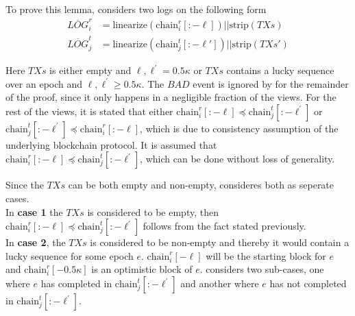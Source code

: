 To prove this lemma, \cite{thunderella} considers two logs on the following form 
\begin{align*}
    \overline{LOG}^r_i &= \text{linearize}(\text{chain}_i^r[:-\ell])||\text{strip}(TXs) \\
    \overline{LOG}^t_j &= \text{linearize}(\text{chain}_j^t[:-\ell'])||\text{strip}(TXs')
\end{align*}

Here $TXs$ is either empty and $\ell,\ell^{'} = 0.5\kappa$ or $TXs$ contains a lucky sequence over an epoch and $\ell,\ell^{'} \geq 0.5\kappa$. The $BAD$ event is ignored by \cite{thunderella} for the remainder of the proof, since it only happens in a negligible fraction of the views. For the rest of the views, it is stated that either $\text{chain}_i^r[:-\ell] \preceq \text{chain}_j^t[:-\ell^{'}]$ or $\text{chain}_j^t[:-\ell^{'}] \preceq \text{chain}_i^r[:-\ell]$, which is due to consistency assumption of the underlying blockchain protocol. It is assumed that $\text{chain}_i^r[:-\ell] \preceq \text{chain}_j^t[:-\ell^{'}]$, which can be done without loss of generality. 

Since the $TXs$ can be both empty and non-empty, \cite{thunderella} consideres both as seperate cases.\\

In \textbf{case 1} the $TXs$ is considered to be empty, then $\text{chain}_i^r[:-\ell] \preceq \text{chain}_j^t[:-\ell^{'}]$ follows from the fact stated previously.\\

In \textbf{case 2}, the $TXs$ is considered to be non-empty and thereby it would contain a lucky sequence for some epoch $e$. $\text{chain}_i^r[-\ell]$ will be the starting block for $e$ and $\text{chain}_i^r[-0.5\kappa]$ is an optimistic block of $e$. \cite{thunderella} considers two sub-cases, one where $e$ has completed in $\text{chain}_j^t[:-\ell^{'}]$ and another where $e$ has not completed in $\text{chain}_j^t[:-\ell^{'}]$.

